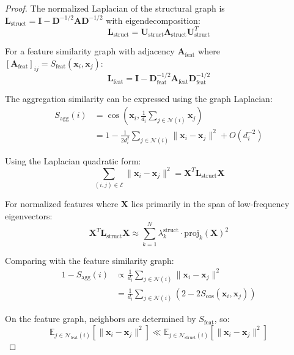 \begin{proof}
The normalized Laplacian of the structural graph is $\mathbf{L}_{\text{struct}} = \mathbf{I} - \mathbf{D}^{-1/2}\mathbf{A}\mathbf{D}^{-1/2}$ with eigendecomposition:
\begin{equation}
\mathbf{L}_{\text{struct}} = \mathbf{U}_{\text{struct}} \mathbf{\Lambda}_{\text{struct}} \mathbf{U}_{\text{struct}}^T
\end{equation}

For a feature similarity graph with adjacency $\mathbf{A}_{\text{feat}}$ where $[\mathbf{A}_{\text{feat}}]_{ij} = S_{\text{feat}}(\mathbf{x}_i, \mathbf{x}_j)$:
\begin{equation}
\mathbf{L}_{\text{feat}} = \mathbf{I} - \mathbf{D}_{\text{feat}}^{-1/2}\mathbf{A}_{\text{feat}}\mathbf{D}_{\text{feat}}^{-1/2}
\end{equation}

The aggregation similarity can be expressed using the graph Laplacian:
\begin{align}
S_{\text{agg}}(i) &= \cos\left(\mathbf{x}_i, \frac{1}{d_i}\sum_{j \in \mathcal{N}(i)}\mathbf{x}_j\right) \\
&= 1 - \frac{1}{2d_i^2}\sum_{j \in \mathcal{N}(i)}\|\mathbf{x}_i - \mathbf{x}_j\|^2 + O(d_i^{-2})
\end{align}

Using the Laplacian quadratic form:
\begin{equation}
\sum_{(i,j) \in \mathcal{E}}\|\mathbf{x}_i - \mathbf{x}_j\|^2 = \mathbf{X}^T \mathbf{L}_{\text{struct}} \mathbf{X}
\end{equation}

For normalized features where $\mathbf{X}$ lies primarily in the span of low-frequency eigenvectors:
\begin{equation}
\mathbf{X}^T \mathbf{L}_{\text{struct}} \mathbf{X} \approx \sum_{k=1}^N \lambda_k^{\text{struct}} \cdot \text{proj}_k(\mathbf{X})^2
\end{equation}

Comparing with the feature similarity graph:
\begin{align}
1 - S_{\text{agg}}(i) &\propto \frac{1}{d_i}\sum_{j \in \mathcal{N}(i)} \|\mathbf{x}_i - \mathbf{x}_j\|^2 \\
&= \frac{1}{d_i}\sum_{j \in \mathcal{N}(i)} \left(2 - 2S_{\cos}(\mathbf{x}_i, \mathbf{x}_j)\right)
\end{align}

On the feature graph, neighbors are determined by $S_{\text{feat}}$, so:
\begin{equation}
\mathbb{E}_{j \in \mathcal{N}_{\text{feat}}(i)}[\|\mathbf{x}_i - \mathbf{x}_j\|^2] \ll \mathbb{E}_{j \in \mathcal{N}_{\text{struct}}(i)}[\|\mathbf{x}_i - \mathbf{x}_j\|^2]
\end{equation}


\end{proof}
